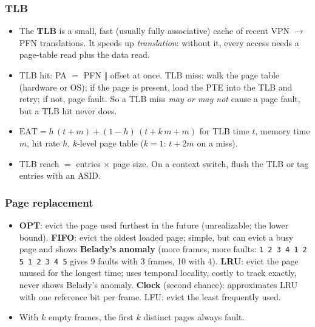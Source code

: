 \subsubsection{TLB}
\begin{itemize}[leftmargin=*]
  \item The \textbf{TLB} is a small, fast (usually fully associative) cache of
  recent VPN $\to$ PFN translations. It speeds up \emph{translation}: without it,
  every access needs a page-table read plus the data read.
  \item TLB hit: PA $=$ PFN $\Vert$ offset at once. TLB miss: walk the page table
  (hardware or OS); if the page is present, load the PTE into the TLB and retry; if
  not, page fault. So a TLB miss \emph{may or may not} cause a page fault, but a TLB
  hit never does.
  \item $\text{EAT}=h\,(t+m)+(1-h)\,(t+k\,m+m)$ for TLB time $t$, memory time $m$,
  hit rate $h$, $k$-level page table ($k=1$: $t+2m$ on a miss).
  \item TLB reach $=$ entries $\times$ page size. On a context switch, flush the TLB
  or tag entries with an ASID.
\end{itemize}

\subsubsection{Page replacement}
\begin{itemize}[leftmargin=*]
  \item \textbf{OPT}: evict the page used furthest in the future (unrealizable;
  the lower bound). \textbf{FIFO}: evict the oldest loaded page; simple, but can
  evict a busy page and shows \textbf{Belady's anomaly} (more frames, more faults:
  \texttt{1 2 3 4 1 2 5 1 2 3 4 5} gives 9 faults with 3 frames, 10 with 4).
  \textbf{LRU}: evict the page unused for the longest time; uses temporal locality,
  costly to track exactly, never shows Belady's anomaly. \textbf{Clock} (second
  chance): approximates LRU with one reference bit per frame. LFU: evict the least
  frequently used.
  \item With $k$ empty frames, the first $k$ distinct pages always fault.
\end{itemize}

